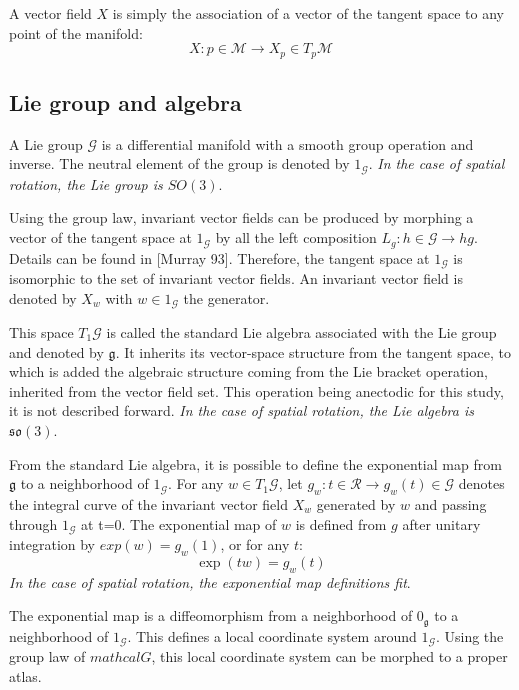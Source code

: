 \documentclass{book}
\begin{document}
A vector field $X$ is simply the association of a vector of the tangent space to any point of the manifold:
\[ X: p \in \mathcal{M} \rightarrow X_p \in T_p \mathcal{M} \]

\subsection{Lie group and algebra}

A Lie group $\mathcal{G}$ is a differential manifold with a smooth group operation and inverse.  The neutral element  of the group is denoted by $1_\mathcal{G}$.
\newline\emph{In the case of spatial rotation, the Lie group is $SO(3)$}. \medskip

Using the group law, invariant vector fields can be produced by morphing a vector of the tangent space at $1_\mathcal{G}$ by all the left composition $L_g : h \in \mathcal{G} \rightarrow hg$. Details can be found in [Murray 93]. Therefore, the tangent space at $1_\mathcal{G}$ is isomorphic to the set of invariant vector fields. An invariant vector field is denoted by $X_w$ with $w \in 1_\mathcal{G}$ the generator.

This space $T_1 \mathcal{G}$  is called the standard Lie algebra associated with the Lie group and denoted by $\mathfrak{g}$. It inherits its vector-space structure from the tangent space, to which is added the algebraic structure coming from the Lie bracket operation, inherited from the vector field set. This operation being anectodic for this study, it is not described forward.
\newline\emph{In the case of spatial rotation, the Lie algebra is $\mathfrak{so}(3)$}. \medskip

From the standard Lie algebra, it is possible to define the exponential map from $\mathfrak{g}$ to a neighborhood of $1_\mathcal{G}$.  For any $w \in T_1 \mathcal{G}$, let $g_w: t \in \mathcal{R} \rightarrow g_w(t) \in \mathcal{G}$ denotes the integral curve of the invariant vector field $X_w$ generated by $w$ and passing through $1_\mathcal{G}$ at t=0. The exponential map of $w$ is defined from $g$ after unitary integration by $exp(w) = g_w(1)$, or for any $t$:
\[ \exp(t w) = g_w(t) \]
\emph{In the case of spatial rotation, the exponential map definitions fit}. \medskip

The exponential map is a diffeomorphism from a neighborhood of $0_\mathfrak{g}$ to a neighborhood of $1_\mathcal{G}$. This defines a local coordinate system around $1_\mathcal{G}$. Using the group law of $mathcal{G}$, this local coordinate system can be morphed to a proper atlas.
\end{document}
